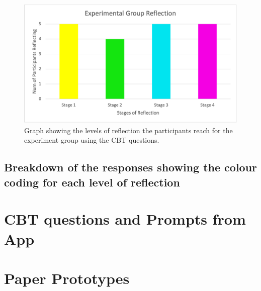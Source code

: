 \documentclass{l4proj}
\begin{document}
\begin{appendices}
\begin{figure}[H]
    \begin{centering}
    \includegraphics[scale=0.5]{images/ABExperimentGraph.png}
    \caption{Graph showing the levels of reflection the participants reach for the experiment group using the CBT questions.}
    \label{fig: Appen-ExperimentGraph}
    \end{centering}
\end{figure}

\subsection{Breakdown of the responses showing the colour coding for each level of reflection} \label{Appendix-AB-responses}





\section{CBT questions and Prompts from App}


\section{Paper Prototypes} \label{Appendix-PaperPrototypes}


\end{appendices}
\end{document}
